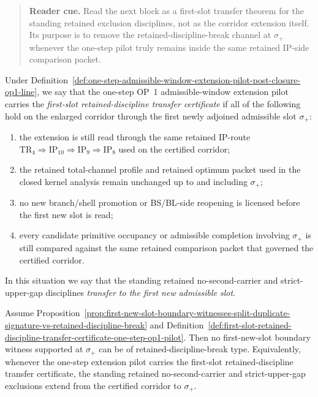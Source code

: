 \begin{quote}\small
\noindent\textbf{Reader cue.} Read the next block as a first-slot transfer theorem for the standing retained exclusion disciplines, not as the corridor extension itself. Its purpose is to remove the retained-discipline-break channel at $\sigma_{+}$ whenever the one-step pilot truly remains inside the same retained IP-side comparison packet.
\end{quote}

\begin{definition}
\label{def:first-slot-retained-discipline-transfer-certificate-one-step-op1-pilot}
Under Definition~\ref{def:one-step-admissible-window-extension-pilot-post-closure-op1-line}, we say that the one-step OP~1 admissible-window extension pilot carries the \emph{first-slot retained-discipline transfer certificate} if all of the following hold on the enlarged corridor through the first newly adjoined admissible slot $\sigma_{+}$:
\begin{enumerate}[leftmargin=2em,label=(\roman*)]
  \item the extension is still read through the same retained IP-route \(\mathrm{TR}_4 \Rightarrow \mathrm{IP}_{10} \Rightarrow \mathrm{IP}_9 \Rightarrow \mathrm{IP}_8\) used on the certified corridor;
  \item the retained total-channel profile and retained optimum packet used in the closed kernel analysis remain unchanged up to and including $\sigma_{+}$;
  \item no new branch/shell promotion or BS/BL-side reopening is licensed before the first new slot is read;
  \item every candidate primitive occupancy or admissible completion involving $\sigma_{+}$ is still compared against the same retained comparison packet that governed the certified corridor.
\end{enumerate}
In this situation we say that the standing retained no-second-carrier and strict-upper-gap disciplines \emph{transfer to the first new admissible slot}.
\end{definition}

\begin{proposition}
\label{prop:first-slot-transfer-removes-retained-discipline-break-channel-sigma-plus}
Assume Proposition~\ref{prop:first-new-slot-boundary-witnesses-split-duplicate-signature-vs-retained-discipline-break} and Definition~\ref{def:first-slot-retained-discipline-transfer-certificate-one-step-op1-pilot}. Then no first-new-slot boundary witness supported at $\sigma_{+}$ can be of retained-discipline-break type. Equivalently, whenever the one-step extension pilot carries the first-slot retained-discipline transfer certificate, the standing retained no-second-carrier and strict-upper-gap exclusions extend from the certified corridor to $\sigma_{+}$.
\end{proposition}

